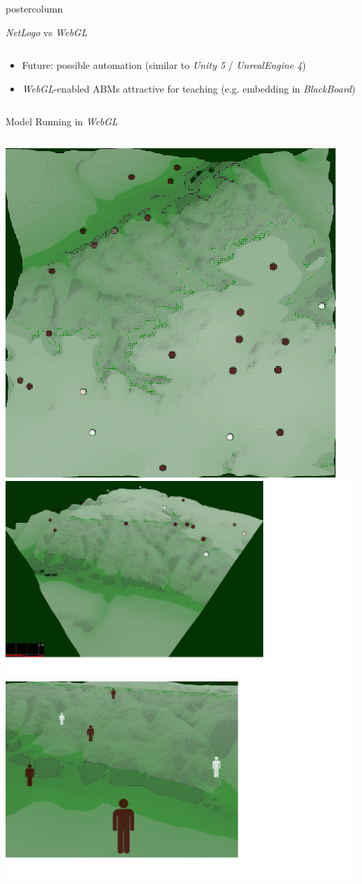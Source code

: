 \documentclass[final,hyperref={pdfpagelabels=false}]{beamer}
\begin{document}
\begin{frame}
\begin{columns}
\begin{column}{.33\textwidth}
\begin{beamercolorbox}[center,wd=\textwidth]{postercolumn}
\begin{minipage}[T]{.95\textwidth}
{\begin{block}{\textit{NetLogo} vs \textit{WebGL}}
\begin{columns}
\begin{column}{.99\textwidth}
\begin{itemize}
\begin{itemize}
                        \item Future: possible automation (similar to \textit{Unity 5} / \textit{UnrealEngine 4})
                        \item \textit{WebGL}-enabled ABMs attractive for teaching (e.g. embedding in \textit{BlackBoard})
                      \end{itemize}
                  \end{itemize}
                \end{column}
              \end{columns}
            \end{block}
            \vfill
            \begin{block}{Model Running in \textit{WebGL}}
              \begin{columns}
                \begin{column}{.99\textwidth}
                  \includegraphics[width=0.32\linewidth]{images/fp1}
                  \-
                  \includegraphics[width=0.32\linewidth]{images/fp2}
                  \-
                  \includegraphics[width=0.32\linewidth]{images/fp3}
                \end{column}
              \end{columns}
            \end{block}
          }
        \end{minipage}
      \end{beamercolorbox}

\end{column}
\end{columns}
\end{frame}
\end{document}
